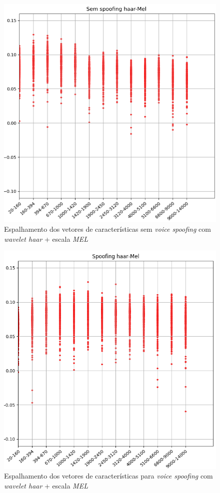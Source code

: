 \begin{figure}[!h]
	\centering
	\includegraphics[width=.70\linewidth, height=.68\linewidth]{images/results/barkVersusMel/liveHaarMel}
	\caption{Espalhamento dos vetores de características sem \textit{voice spoofing} com \textit{wavelet haar} + escala \textit{MEL} }
	\label{fig:livehaarmel}
\end{figure}
\begin{figure}[!h]
	\centering
	\includegraphics[width=.70\linewidth, height=.68\linewidth]{images/results/barkVersusMel/spoofingHaarMel}
	\caption{Espalhamento dos vetores de características para \textit{voice spoofing} com \textit{wavelet haar} + escala \textit{MEL} }
	\label{fig:spoofinghaarmel}
\end{figure}
